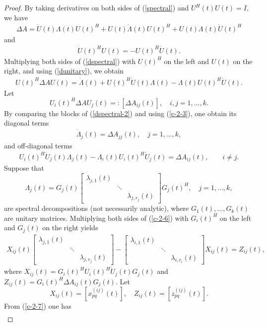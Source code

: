\documentclass[11pt,a4paper]{article}
\numberwithin{equation}{section}
\newcommand {\mat} [1] {\left[\begin{array}{#1}}
\newcommand {\rix}     {\end{array}\right]}
\begin{document}
\begin{proof}
By taking derivatives on both sides of (\ref{spectral}) and $U^H(t)U(t)=I,$ we have
\begin{eqnarray}\label{dspectral}
\Delta A=\dot{U}(t)\Lambda(t)U(t)^H+U(t)\dot{\Lambda}(t)U(t)^H+U(t)\Lambda(t)\dot{U}(t)^H
\end{eqnarray}
and
\begin{eqnarray}\label{dunitary}
\dot{U}(t)^H U(t)=-U(t)^H \dot{U}(t).
\end{eqnarray}
Multiplying both sides of (\ref{dspectral}) with $U(t)^H$ on the left and $U(t)$ on the right,
and using  (\ref{dunitary}), we obtain
\begin{eqnarray}\label{dspectral-2}
U(t)^H \Delta A U(t) =\dot{\Lambda}(t)+U(t)^H \dot{U}(t)\Lambda(t)-\Lambda(t) U(t)^H \dot{U}(t).
\end{eqnarray}
Let
\[
U_i(t)^H\Delta AU_j(t)=:[\Delta A_{ij}(t)],\quad i,j=1,\ldots,k.
\]
By comparing the blocks of (\ref{dspectral-2}) and using (\ref{c-2-3}), one obtain its diagonal terms
\begin{eqnarray}\label{c-2-5}
\dot\Lambda_j(t)=\Delta A_{jj}(t),\quad j=1,\ldots, k,
\end{eqnarray}
and off-diagonal terms
\begin{eqnarray}\label{c-2-6}
U_i(t)^H\dot U_j(t)\Lambda_j(t)-\Lambda_i(t)U_i(t)^H\dot U_j(t)=\Delta A_{ij}(t),
\qquad i\ne j.
\end{eqnarray}
Suppose that
\[
\Lambda_j(t)=G_j(t)\mat{ccc}\lambda_{j,1}(t)&&\\&\ddots&\\&&\lambda_{j,r_j}(t)\rix
G_j(t)^H,\quad j=1,\ldots,k,
\]
are  spectral decompositions (not necessarily analytic),
where $G_1(t),\ldots,G_k(t)$
are unitary matrices. Multiplying both sides of (\ref{c-2-6}) with $G_i(t)^H$ on the left and  $G_j(t)$ on the right yields
\begin{eqnarray}\label{c-2-7}
X_{ij}(t)\mat{ccc}\lambda_{j,1}(t)&&\\&\ddots&\\&&\lambda_{j,r_j}(t)\rix-
\mat{ccc}\lambda_{i,1}(t)&&\\&\ddots&\\&&\lambda_{i,r_i}(t)\rix X_{ij}(t)
=Z_{ij}(t),
\end{eqnarray}
where $X_{ij}(t)=G_i(t)^HU_i(t)^H\dot U_j(t)G_j(t)$
and $Z_{ij}(t)=G_i(t)^H\Delta A_{ij}(t)G_j(t)$. Let
$$X_{ij}(t)=[x^{(ij)}_{pq}(t)],\quad   Z_{ij}(t)=[z_{pq}^{(ij)}(t)].$$
 From (\ref{c-2-7}) one has
\begin{eqnarray*}

\end{eqnarray*}
\end{proof}
\end{document}
